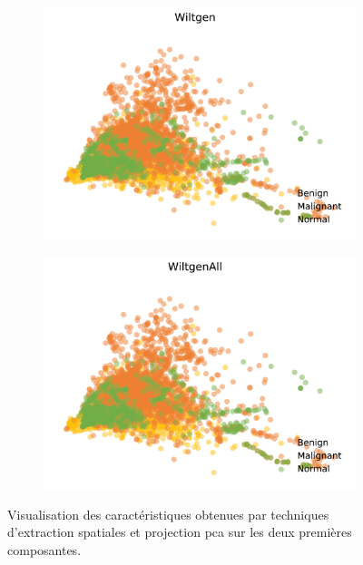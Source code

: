 \begin{figure}[H]
    \begin{subfigure}{.45\textwidth}
      \includegraphics[width=\textwidth]{contents/chapter_4/resources/visualisation_spatial_Wiltgen.png}
    \end{subfigure}
    \begin{subfigure}{.45\textwidth}
      \includegraphics[width=\textwidth]{contents/chapter_4/resources/visualisation_spatial_WiltgenAll.png}
    \end{subfigure}
    
    \caption{Visualisation des caractéristiques obtenues par techniques d'extraction spatiales et projection \gls{pca} sur les deux premières composantes.}
    \label{fig:visualisation_spatial}
\end{figure}\par

